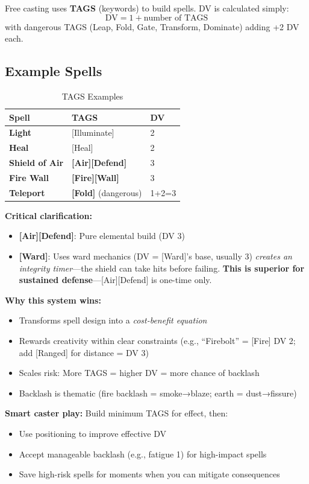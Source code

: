 \documentclass[11pt]{article}
\begin{document}
Free casting uses \textbf{TAGS} (keywords) to build spells. DV is calculated simply:
\[
\text{DV} = 1 + \text{number of TAGS}
\]
with dangerous TAGS (Leap, Fold, Gate, Transform, Dominate) adding +2 DV each.

\subsection{Example Spells}
\begin{table}[h]
\centering
\caption{TAGS Examples}
\begin{tabular}{>{\bfseries}l l l}
\toprule
Spell & TAGS & DV \\
\midrule
Light & [Illuminate] & 2 \\
Heal & [Heal] & 2 \\
Shield of Air & \textbf{[Air][Defend]} & 3 \\
Fire Wall & \textbf{[Fire][Wall]} & 3 \\
Teleport & \textbf{[Fold]} (dangerous) & 1+2=3 \\
\bottomrule
\end{tabular}
\end{table}

\textbf{Critical clarification:} 
\begin{itemize}
    \item \textbf{[Air][Defend]}: Pure elemental build (DV 3)
    \item \textbf{[Ward]}: Uses ward mechanics (DV = [Ward]'s base, usually 3) \textit{creates an integrity timer}—the shield can take hits before failing. \textbf{This is superior for sustained defense}—[Air][Defend] is one-time only.
\end{itemize}

\textbf{Why this system wins:}
\begin{itemize}
    \item Transforms spell design into a \textit{cost-benefit equation}
    \item Rewards creativity within clear constraints (e.g., ``Firebolt'' = [Fire] DV 2; add [Ranged] for distance = DV 3)
    \item Scales risk: More TAGS = higher DV = more chance of backlash
    \item Backlash is thematic (fire backlash = smoke→blaze; earth = dust→fissure)
\end{itemize}

\textbf{Smart caster play:} Build minimum TAGS for effect, then:
\begin{itemize}
    \item Use positioning to improve effective DV
    \item Accept manageable backlash (e.g., fatigue 1) for high-impact spells
    \item Save high-risk spells for moments when you can mitigate consequences
\end{itemize}
\end{document}
